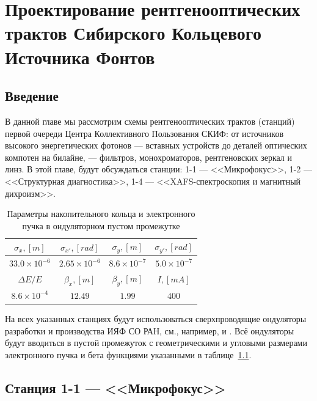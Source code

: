 \chapter{Проектирование рентгенооптических трактов Сибирского Кольцевого Источника Фонтов}

\section{Введение}
В данной главе мы рассмотрим схемы рентгенооптических трактов (станций) первой очереди Центра Коллективного Пользования СКИФ: от источников высокого энергетических фотонов --- вставных устройств до деталей оптических компотен на билайне, --- фильтров, монохроматоров, рентгеновских зеркал и линз. В этой главе, будут обсуждаться станции: 1-1 --- <<Микрофокус>>, 1-2 --- <<Структурная диагностика>>, 1-4 --- <<XAFS-спектроскопия и магнитный дихроизм>>.  
\begin{table}[h!]
	\caption{Параметры накопительного кольца и электронного пучка в ондуляторном пустом промежутке}
	\centering
	\label{table:ebeam}
	\begin{tabular}{c|c|c|c}
		\hline\hline
		\rule{0pt}{3ex}   $\sigma_x, [m]$ & $\sigma_{x'}, [rad]$ & $\sigma_y, [m]$     & $\sigma_{y'}, [rad]$ \\ \hline
		\rule{0pt}{3ex}   $33.0 \times 10^{-6}$  & $2.65 \times 10^{-6}$  &  $8.6 \times 10^{-7}$ & $5.0 \times 10^{-7}$   \\
		\hline	\hline
		\rule{0pt}{3ex}   $\Delta E / E$ & $\beta_x,[m]$ & $\beta_y,[m]$   & $I,[mA]$\\ \hline
		\rule{0pt}{3ex}	 $8.6 \times 10^{-4}$ & $12.49$ & $1.99$ & $400$ \\ \hline\hline
	\end{tabular}
	\vspace{4pt} 
\end{table}

На всех указанных станциях будут использоваться сверхпроводящие ондуляторы разработки и производства ИЯФ СО РАН, см., например, \cite{bragin2018short} и \cite{gluskin2019superconducting}. Всё ондуляторы будут вводиться в пустой промежуток с геометрическими и угловыми размерами электронного пучка и бета функциями указанными в таблице~\ref{table:ebeam}. 

\section{Станция 1-1 --- <<Микрофокус>>}
